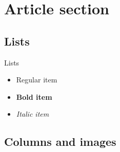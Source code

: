 
\section{Article section}

\subsection{Lists}
\begin{frame}{Lists}
  \begin{itemize}
      \item Regular item
      \item \textbf{Bold item}
      \item \textit{Italic item}
  \end{itemize}
\end{frame}

\subsection{Columns and images}

